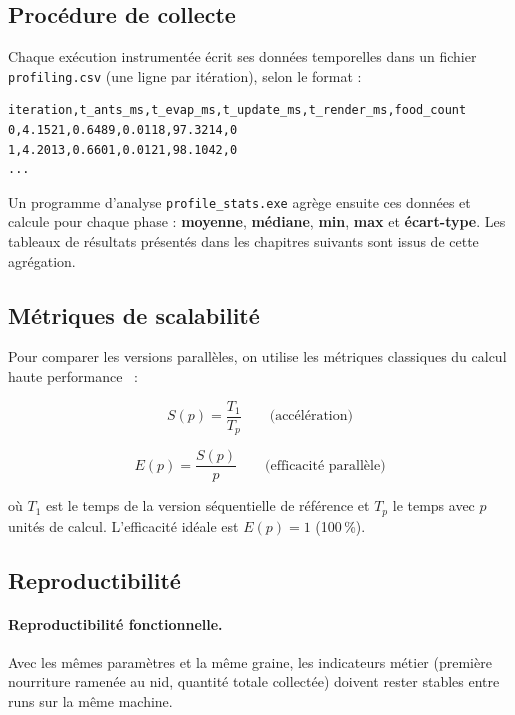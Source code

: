 \subsection{Procédure de collecte}

Chaque exécution instrumentée écrit ses données temporelles dans un fichier
\texttt{profiling.csv} (une ligne par itération), selon le format :

\begin{lstlisting}[language={},caption={Format du fichier profiling.csv}]
iteration,t_ants_ms,t_evap_ms,t_update_ms,t_render_ms,food_count
0,4.1521,0.6489,0.0118,97.3214,0
1,4.2013,0.6601,0.0121,98.1042,0
...
\end{lstlisting}

Un programme d'analyse \texttt{profile\_stats.exe} agrège ensuite ces données et
calcule pour chaque phase : \textbf{moyenne}, \textbf{médiane}, \textbf{min},
\textbf{max} et \textbf{écart-type}. Les tableaux de résultats présentés dans les
chapitres suivants sont issus de cette agrégation.

\subsection{Métriques de scalabilité}

Pour comparer les versions parallèles, on utilise les métriques classiques du
calcul haute performance~\cite{gropp1999mpi} :

\begin{equation}
    S(p) = \frac{T_1}{T_p}
    \qquad \text{(accélération)}
    \label{eq:speedup}
\end{equation}

\begin{equation}
    E(p) = \frac{S(p)}{p}
    \qquad \text{(efficacité parallèle)}
    \label{eq:efficiency}
\end{equation}

où $T_1$ est le temps de la version séquentielle de référence et $T_p$ le temps
avec $p$ unités de calcul. L'efficacité idéale est $E(p) = 1$ (100\,\%).

\subsection{Reproductibilité}

\paragraph{Reproductibilité fonctionnelle.}
Avec les mêmes paramètres et la même graine, les indicateurs métier (première
nourriture ramenée au nid, quantité totale collectée) doivent rester stables
entre runs sur la même machine.

